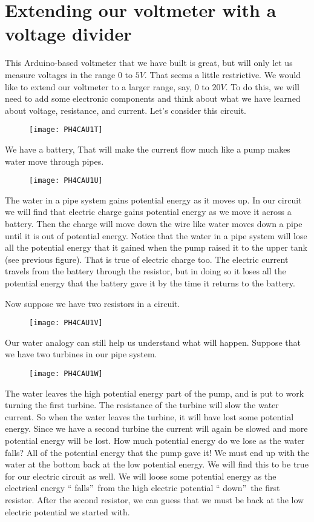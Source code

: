 \section{Extending our voltmeter with a voltage divider\label{Voltmeter with
Voltage Divider}}

This Arduino-based voltmeter that we have built is great, but will only let
us measure voltages in the range $0$ to $5\unit{V}.$ That seems a little
restrictive. We would like to extend our voltmeter to a larger range, say, $%
0 $ to $20\unit{V}.$ To do this, we will need to add some electronic
components and think about what we have learned about voltage, resistance,
and current. Let's consider this circuit.\begin{figure}[h!]
\texttt{[image: PH4CAU1T]}
\end{figure}We have a battery, That will make
the current flow much like a pump makes water move through pipes.

\begin{figure}[h!]
\texttt{[image: PH4CAU1U]}
\end{figure}The water in a pipe system gains
potential energy as it moves up. In our circuit we will find that electric
charge gains potential energy as we move it across a battery. Then the
charge will move down the wire like water moves down a pipe until it is out
of potential energy. Notice that the water in a pipe system will lose all
the potential energy that it gained when the pump raised it to the upper
tank (see previous figure). That is true of electric charge too. The
electric current travels from the battery through the resistor, but in doing
so it loses all the potential energy that the battery gave it by the time it
returns to the battery.

Now suppose we have two resistors in a circuit. \begin{figure}[h!]
\texttt{[image: PH4CAU1V]}
\end{figure}

Our water analogy can still help us understand what will happen. Suppose
that we have two turbines in our pipe system. \begin{figure}[h!]
\texttt{[image: PH4CAU1W]}
\end{figure}The water leaves the high
potential energy part of the pump, and is put to work turning the first
turbine. The resistance of the turbine will slow the water current. So when
the water leaves the turbine, it will have lost some potential energy. Since
we have a second turbine the current will again be slowed and more potential
energy will be lost. How much potential energy do we lose as the water
falls? All of the potential energy that the pump gave it! We must end up
with the water at the bottom back at the low potential energy. We will find
this to be true for our electric circuit as well. We will loose some
potential energy as the electrical energy \textquotedblleft
falls\textquotedblright\ from the high electric potential \textquotedblleft
down\textquotedblright\ the first resistor. After the second resistor, we
can guess that we must be back at the low electric potential we started with.

